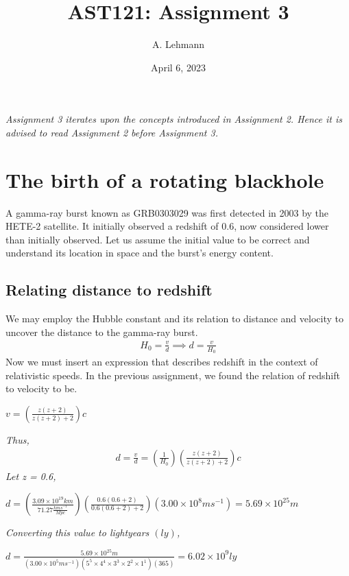 \documentclass{article}
\title{AST121: Assignment 3}
\author{A. Lehmann}
\date{April 6, 2023}
\begin{document}
	\maketitle
		\textit{Assignment 3 iterates upon the concepts introduced in Assignment 2. Hence it is advised to read Assignment 2 before Assignment 3. }
	\tableofcontents

\newpage
\section{The birth of a rotating blackhole}

A gamma-ray burst known as GRB0303029 was first detected in 2003 by the HETE-2 satellite. It initially observed a redshift of 0.6, now considered lower than initially observed. Let us assume the initial value to be correct and understand its location in space and the burst's energy content.

\subsection{Relating distance to redshift}
We may employ the Hubble constant and its relation to distance and velocity to uncover the distance to the gamma-ray burst.
\begin{gather*}
	H_0 = \frac{v}{d} \implies d = \frac{v}{H_0}
\end{gather*}
Now we must insert an expression that describes redshift in the context of relativistic speeds. In the previous assignment, we found the relation of redshift to velocity to be. 
\begin{center}
	$\boxed{
v = \left(\frac{z(z+2)}{z(z+2)+2}\right)c}
$

\end{center}

\textit{Thus,}
\begin{gather*}
	d = \frac{v}{d} = \left(\frac{1}{H_0}\right)\left(\frac{z(z+2)}{z(z+2)+2}\right)c
\end{gather*}
\textit{Let z = 0.6,}
\begin{center}
	$
	\boxed{d =  \left(\frac{3.09\times10^{19}km}{71.27\frac{kms^{-1}}{Mpc}}\right)\left(\frac{0.6(0.6+2)}{0.6(0.6+2)+2}\right)(3.00\times10^8ms^{-1}) = 5.69\times10^{25}m}$
\end{center}
\textit{Converting this value to lightyears $(ly)$,}
\begin{center}
	$\boxed{d = \frac{5.69\times10^{25}m}{(3.00\times10^5ms^{-1})(5^5\times4^4\times3^3\times2^2\times1^1)(365)}=6.02\times10^9ly}
	$	
\end{center}
\end{document}

